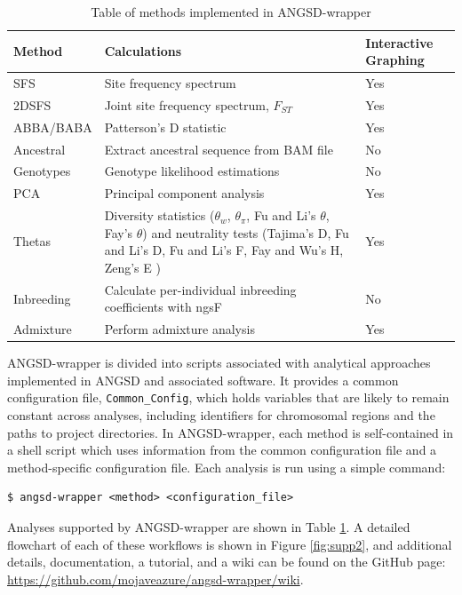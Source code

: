 \documentclass[10pt,a4paper]{article}
\newcommand{\fst}{${F_{ST}}$ }
\begin{document}
\begin{table}
\begin{center}
    \caption{Table of methods implemented in ANGSD-wrapper}
    \begin{tabular}{ | p{3.5cm} | p{5cm} | p{2.5cm}  |}
    \hline
    \textbf{Method} & \textbf{Calculations} & \textbf{Interactive Graphing} \\ \hline
    SFS     &    Site frequency spectrum  & Yes  \\ \hline     2DSFS   &    Joint site frequency spectrum, \fst & Yes  \\ \hline 
    ABBA/BABA  &  Patterson's D statistic & Yes  \\ \hline 
    Ancestral &  Extract ancestral sequence from BAM file  & No \\ \hline 
    Genotypes &  Genotype likelihood estimations & No  \\ \hline 
    PCA     &    Principal component analysis & Yes  \\ \hline 
    Thetas   &   Diversity statistics ($\theta_w$, $\theta_\pi$, Fu and Li's $\theta$, Fay's $\theta$) and neutrality tests (Tajima's D, Fu and Li's D, Fu and Li's F,  Fay and Wu's H, Zeng's E ) & Yes  \\ \hline 
    Inbreeding & Calculate per-individual inbreeding coefficients with ngsF & No  \\ \hline 
    Admixture  & Perform admixture analysis & Yes  \\ \hline 
    \end{tabular}
    \label{tab:methods}
    \end{center}
\end{table}

ANGSD-wrapper is divided into scripts associated with analytical approaches implemented in ANGSD and associated software. 
It provides a common configuration file, \texttt{Common\_Config}, which holds variables that are likely to remain constant across analyses, including identifiers for chromosomal regions and the paths to project directories.
In ANGSD-wrapper, each method is self-contained in a shell script which uses information from the common configuration file and a method-specific configuration file. 
Each analysis is run using a simple command:

\begin{lstlisting}
$ angsd-wrapper <method> <configuration_file>
\end{lstlisting}

Analyses supported by ANGSD-wrapper are shown in Table \ref{tab:methods}.
A detailed flowchart of each of these workflows is shown in Figure \ref{fig:supp2}, and additional details, documentation, a tutorial, and a wiki can be found on the GitHub page: \url{https://github.com/mojaveazure/angsd-wrapper/wiki}.
\end{document}
